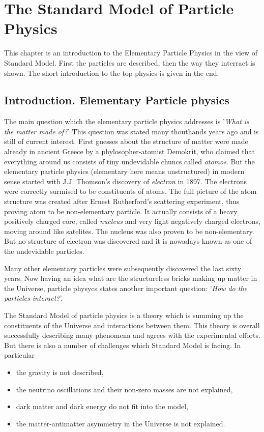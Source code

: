 \chapter{The Standard Model of Particle Physics}\label{chapt:SM}

This chapter is an introduction to the Elementary Particle Physics in the view of Standard Model.
First the particles are described, then the way they interract is shown. The short introduction
to the top physics is given in the end.

\section{Introduction. Elementary Particle physics}

The main question which the elementary particle physics addresses is '\textit{What is the matter made of?}'
This question was stated many thouthands years ago and is still of current interest. First guesses about
the structure of matter were made already in ancient Greece by a phylosopher-atomist Demokrit, who
claimed that everything around us consists of tiny undevidable chuncs called \textit{atomos}\cite{yangcn}.
But the elementary particle physics (elementary here means unstructured) in modern sense started with 
J.J. Thomson's discovery of \textit{electron}\cite{jjthome} in 1897. The electrons were correctly surmised to be constituents
of atoms. The full picture of the atom structure was created after Ernest Rutherford's scattering experiment\cite{rutherford},
thus proving atom to be non-elementary particle. It actually consists of a heavy positively charged core, called 
\textit{nucleus} and very light negatively charged electrons, moving around like satelites. 
The nucleus was also proven to be non-elementary. But no structure of electron was discovered 
and it is nowadays known as one of the undevidable particles. 

Many other elementary particles were subsequently discovered the last sixty years. Now having an idea 
what are the structureless bricks making up matter in the Universe, particle physycs
states another important question: '\textit{How do the particles interact?}'.

The Standard Model of particle physics is a theory which is summing up the constituents of the Universe
and interactions between them. This theory is overall successfully describing many phenomena and 
agrees with the experimental efforts. But there is also a number of challenges which Standard Model
is facing. In particular
\begin{itemize}
 \item the gravity is not described,
 \item the neutrino oscillations and their non-zero masses are not explained,
 \item dark matter and dark energy do not fit into the model,
 \item the matter-antimatter asymmetry in the Universe is not explained.
\end{itemize}


